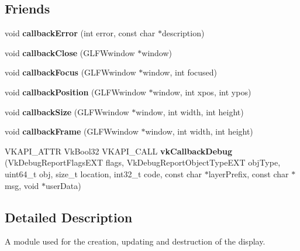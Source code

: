 \subsection*{Friends}
\begin{DoxyCompactItemize}
\item 
\mbox{\label{classflounder_1_1display_a6e2f7636c5e3fe93e7ae254f055d2ac1}} 
void {\bfseries callback\+Error} (int error, const char $\ast$description)
\item 
\mbox{\label{classflounder_1_1display_ad1fb7c8678d6c41a7b539440f01df61e}} 
void {\bfseries callback\+Close} (G\+L\+F\+Wwindow $\ast$window)
\item 
\mbox{\label{classflounder_1_1display_ac00c6be12bf18837bd3960c3ba402f3f}} 
void {\bfseries callback\+Focus} (G\+L\+F\+Wwindow $\ast$window, int focused)
\item 
\mbox{\label{classflounder_1_1display_a39d3d8fb74851349d8a437aa6a3f2b35}} 
void {\bfseries callback\+Position} (G\+L\+F\+Wwindow $\ast$window, int xpos, int ypos)
\item 
\mbox{\label{classflounder_1_1display_af765170864757051f6a767c26700bb82}} 
void {\bfseries callback\+Size} (G\+L\+F\+Wwindow $\ast$window, int width, int height)
\item 
\mbox{\label{classflounder_1_1display_a0d3e5fdd07e5059768ff51de12b0b29f}} 
void {\bfseries callback\+Frame} (G\+L\+F\+Wwindow $\ast$window, int width, int height)
\item 
\mbox{\label{classflounder_1_1display_a2ea8cc48550598d91ddd8845043eebf1}} 
V\+K\+A\+P\+I\+\_\+\+A\+T\+TR Vk\+Bool32 V\+K\+A\+P\+I\+\_\+\+C\+A\+LL {\bfseries vk\+Callback\+Debug} (Vk\+Debug\+Report\+Flags\+E\+XT flags, Vk\+Debug\+Report\+Object\+Type\+E\+XT obj\+Type, uint64\+\_\+t obj, size\+\_\+t location, int32\+\_\+t code, const char $\ast$layer\+Prefix, const char $\ast$msg, void $\ast$user\+Data)
\end{DoxyCompactItemize}


\subsection{Detailed Description}
A module used for the creation, updating and destruction of the display. 



